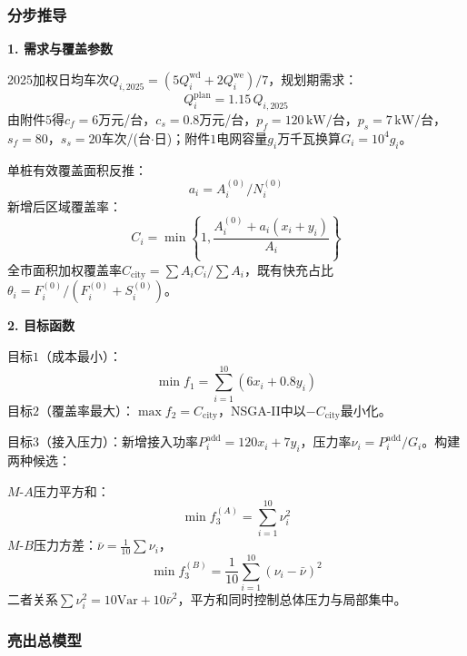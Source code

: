\documentclass[a4paper,12pt]{ctexart}
\begin{document}
\subsubsection{分步推导}

\textbf{1. 需求与覆盖参数}

2025加权日均车次$Q_{i,2025}=(5Q_{i}^{\mathrm{wd}}+2Q_{i}^{\mathrm{we}})/7$，规划期需求：
\begin{equation}
Q_{i}^{\mathrm{plan}}=1.15\,Q_{i,2025}\tag{2-1}
\end{equation}
由附件$5$得$c_{f}=6$万元/台，$c_{s}=0.8$万元/台，$p_{f}=120\,\mathrm{kW/台}$，$p_{s}=7\,\mathrm{kW/台}$，$s_{f}=80$，$s_{s}=20$车次/(台$\cdot$日)；附件$1$电网容量$g_{i}$万千瓦换算$G_{i}=10^{4}g_{i}$。

单桩有效覆盖面积反推：
\begin{equation}
a_{i}=A_{i}^{(0)}/N_{i}^{(0)}\tag{2-2}
\end{equation}
新增后区域覆盖率：
\begin{equation}
C_{i}=\min\left\{1,\frac{A_{i}^{(0)}+a_{i}(x_{i}+y_{i})}{A_{i}}\right\}\tag{2-3}
\end{equation}
全市面积加权覆盖率$C_{\mathrm{city}}=\sum A_{i}C_{i}/\sum A_{i}$，既有快充占比$\theta_{i}=F_{i}^{(0)}/(F_{i}^{(0)}+S_{i}^{(0)})$。

\textbf{2. 目标函数}

目标$1$（成本最小）：
\begin{equation}
\min f_{1}=\sum_{i=1}^{10}(6x_{i}+0.8y_{i})\tag{2-4}
\end{equation}
目标$2$（覆盖率最大）：$\max f_{2}=C_{\mathrm{city}}$，NSGA-II中以$-C_{\mathrm{city}}$最小化。

目标$3$（接入压力）：新增接入功率$P_{i}^{\mathrm{add}}=120x_{i}+7y_{i}$，压力率$\nu_{i}=P_{i}^{\mathrm{add}}/G_{i}$。构建两种候选：

$M\text{-}A$压力平方和：
\begin{equation}
\min f_{3}^{(A)}=\sum_{i=1}^{10}\nu_{i}^{2}\tag{2-5}
\end{equation}
$M\text{-}B$压力方差：$\bar{\nu}=\frac{1}{10}\sum\nu_{i}$，
\begin{equation}
\min f_{3}^{(B)}=\frac{1}{10}\sum_{i=1}^{10}(\nu_{i}-\bar{\nu})^{2}\tag{2-6}
\end{equation}
二者关系$\sum\nu_{i}^{2}=10\mathrm{Var}+10\bar{\nu}^{2}$，平方和同时控制总体压力与局部集中。

\subsubsection{亮出总模型}
\end{document}
